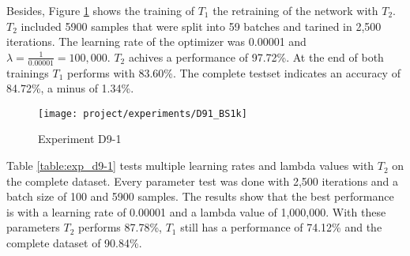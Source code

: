 Besides, Figure \ref{fig:exp_d9-1_bs1k} shows the training of $T_1$ the retraining of the network with $T_2$.
$T_2$ included 5900 samples that were split into 59 batches and tarined in 2,500 iterations.
The learning rate of the optimizer was 0.00001 and $\lambda = \frac{1}{0.00001} = 100,000$.
$T_2$ achives a performance of 97.72\%.
At the end of both trainings $T_1$ performs with 83.60\%.
The complete testset indicates an accuracy of 84.72\%, a minus of 1.34\%.

\begin{figure}[H]
    \centering
    \texttt{[image: project/experiments/D91\_BS1k]}
    \caption{Experiment D9-1}
    \label{fig:exp_d9-1_bs1k}
\end{figure}

\newpage

Table \ref{table:exp_d9-1} tests multiple learning rates and lambda values with $T_2$ on the complete dataset.
Every parameter test was done with 2,500 iterations and a batch size of 100 and 5900 samples.
\newline
The results show that the best performance is with a learning rate of 0.00001 and a lambda value of 1,000,000.
With these parameters $T_2$ performs 87.78\%, $T_1$ still has a performance of 74.12\% and the complete dataset of 90.84\%.

